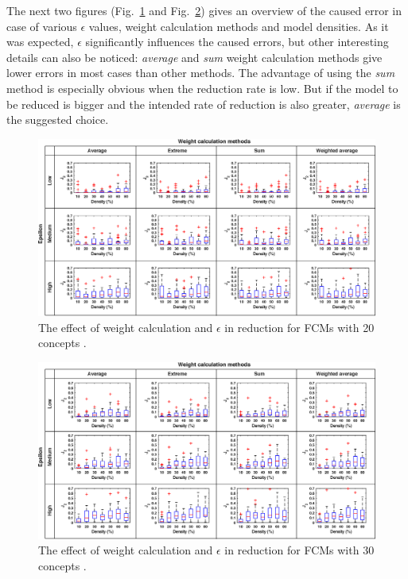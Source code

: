 \documentclass[graybox]{svmult}
\begin{document}
The next two figures (Fig.~\ref{fig:epsilonWeightEffect20} and 
Fig.~\ref{fig:epsilonWeightEffect30}) gives an overview of the caused 
error in case of various $\epsilon$ values, weight calculation methods 
and model densities. As it was expected, $\epsilon$ significantly 
influences the caused errors, but other interesting details can also be 
noticed: \emph{average} and \emph{sum} weight calculation methods give 
lower errors in most cases than other methods. The advantage of using 
the \emph{sum} method is especially obvious when the reduction rate is 
low. But if the model to be reduced is bigger and the intended rate of 
reduction is also greater, \emph{average} is the suggested choice. 

\begin{figure}[hbt]
  \includegraphics[width=\textwidth]{j2_unsup_c20.eps}
  \caption{The effect of weight calculation and $\epsilon$ in reduction 
  for FCMs with 20 concepts \cite{hatwagner2018two}.}
  \label{fig:epsilonWeightEffect20}
\end{figure}

\begin{figure}[hbt]
  \includegraphics[width=\textwidth]{j2_unsup_c30.eps}
  \caption{The effect of weight calculation and $\epsilon$ in reduction 
  for FCMs with 30 concepts \cite{hatwagner2018two}.}
  \label{fig:epsilonWeightEffect30}
\end{figure}
\end{document}
